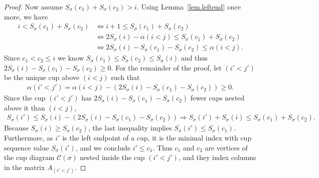 \documentclass[11pt]{amsart}
\theoremstyle{remark}
\theoremstyle{remark}
\theoremstyle{definition}
\theoremstyle{definition}
\theoremstyle{definition}
\numberwithin{equation}{section}
\newcommand{\gs}{\sigma}
\newcommand{\cc}{\mathcal{C}}
\newcommand{\al}{\alpha}
\newcommand{\cupsigma}{\cc(\gs)}
\begin{document}
\begin{proof}
Now assume $S_\gs(c_1) + S_\gs(c_2)>i$.  Using Lemma~\ref{lem.leftend} once more, we have 
\begin{align*}
i<S_\gs(c_1) + S_\gs(c_2) &\Leftrightarrow i + 1 \leq  S_\gs(c_1) + S_\gs(c_2) \\
& \Leftrightarrow 2 S_{\gs}(i)-\al(i<j) \leq S_\gs(c_1) + S_\gs(c_2) \\
& \Leftrightarrow 2 S_{\gs}(i)- S_\gs(c_1)-S_\gs(c_2) \leq \al(i<j). 
\end{align*}
Since $c_1<c_2\leq i$ we know $S_\gs(c_1)\leq S_\gs(c_2)\leq S_\gs(i)$ and thus $2 S_{\gs}(i)- S_\gs(c_1)-S_\gs(c_2)\geq 0$. For the remainder of the proof, let $(i'<j')$ be the unique cup above $(i<j)$ such that 
\begin{eqnarray}\label{eqn.i'<j'def}
\al(i'<j') = \al(i<j) - \left( 2 S_{\gs}(i)- S_\gs(c_1)-S_\gs(c_2) \right) \geq 0.
\end{eqnarray}
Since the cup $(i'<j')$ has $2 S_{\gs}(i)- S_\gs(c_1)-S_\gs(c_2)$ fewer cups nested above it than $(i<j)$, 
\begin{align*}
S_\gs(i') \leq  S_\gs(i) - \left(2 S_{\gs}(i)- S_\gs(c_1)-S_\gs(c_2) \right) \Rightarrow S_\gs(i')+S_\gs(i) \leq S_\gs(c_1)+S_\gs(c_2).
\end{align*}
Because $S_\gs(i)\geq S_\gs(c_2)$, the last inequality implies $S_\gs(i') \leq S_\gs(c_1)$. Furthermore, as $i'$ is the left endpoint of a cup, it is the minimal index with cup sequence value $S_\gs(i')$, and we conclude $i'\leq c_1$. Thus $c_1$ and $c_2$ are vertices of the cup diagram $\cupsigma$ nested inside the cup $(i'<j')$, and they index columns in the matrix $A_{(i'<j')}$. 



\end{proof}
\end{document}
